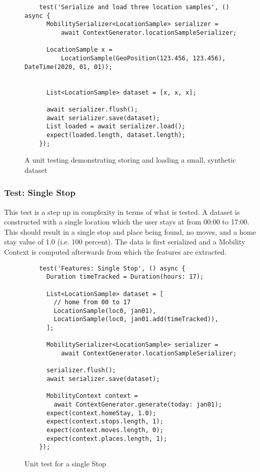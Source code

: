 \begin{figure}
    \centering
    \begin{verbatim}
    test('Serialize and load three location samples', () async {
      MobilitySerializer<LocationSample> serializer =
          await ContextGenerator.locationSampleSerializer;

      LocationSample x =
          LocationSample(GeoPosition(123.456, 123.456), DateTime(2020, 01, 01));


      List<LocationSample> dataset = [x, x, x];

      await serializer.flush();
      await serializer.save(dataset);
      List loaded = await serializer.load();
      expect(loaded.length, dataset.length);
    });
    \end{verbatim}
    \caption{A unit testing demonstrating storing and loading a small, synthetic dataset}
    \label{fig:my_label}
\end{figure}

\subsubsection*{Test: Single Stop}
This test is a step up in complexity in terms of what is tested. A dataset is constructed with a single location which the user stays at from 00:00 to 17:00. This should result in a single stop and place being found, no moves, and a home stay value of 1.0 (i.e. 100 percent). The data is first serialized and a Mobility Context is computed afterwards from which the features are extracted.

\begin{figure}
    \centering
    \begin{verbatim}
    test('Features: Single Stop', () async {
      Duration timeTracked = Duration(hours: 17);

      List<LocationSample> dataset = [
        // home from 00 to 17
        LocationSample(loc0, jan01),
        LocationSample(loc0, jan01.add(timeTracked)),
      ];

      MobilitySerializer<LocationSample> serializer =
          await ContextGenerator.locationSampleSerializer;

      serializer.flush();
      await serializer.save(dataset);

      MobilityContext context = 
        await ContextGenerator.generate(today: jan01);
      expect(context.homeStay, 1.0);
      expect(context.stops.length, 1);
      expect(context.moves.length, 0);
      expect(context.places.length, 1);
    });
    \end{verbatim}
    \caption{Unit test for a single Stop}
    \label{fig:test-single-stop}
\end{figure}

